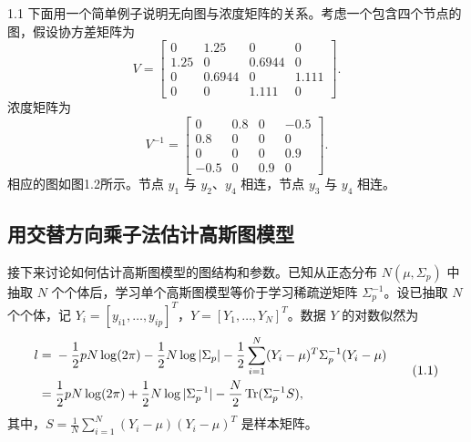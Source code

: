 \begin{bookexample}{1.1}
下面用一个简单例子说明无向图与浓度矩阵的关系。考虑一个包含四个节点的图，假设协方差矩阵为
\[
V=\begin{bmatrix}
0&1.25&0&0\\
1.25&0&0.6944&0\\
0&0.6944&0&1.111\\
0&0&1.111&0
\end{bmatrix}.
\]
浓度矩阵为
\[
V^{-1}=\begin{bmatrix}
0&0.8&0&-0.5\\
0.8&0&0&0\\
0&0&0&0.9\\
-0.5&0&0.9&0
\end{bmatrix}.
\]
相应的图如图1.2所示。节点 $y_1$ 与 $y_2$、$y_4$ 相连，节点 $y_3$ 与 $y_4$ 相连。
\end{bookexample}

\begin{figure}[htbp]
\centering
{}
\end{figure}

\subsection{用交替方向乘子法估计高斯图模型}

接下来讨论如何估计高斯图模型的图结构和参数。已知从正态分布 $N(\mu,\Sigma_p)$ 中抽取 $N$ 个个体后，学习单个高斯图模型等价于学习稀疏逆矩阵 $\Sigma_p^{-1}$。设已抽取 $N$ 个个体，记 $Y_i=[y_{i1},\ldots,y_{ip}]^T$，$Y=[Y_1,\ldots,Y_N]^T$。数据 $Y$ 的对数似然为
\begin{equation}
\begin{aligned}
l={}&-\frac12pN\log(2\pi)-\frac12N\log|\Sigma_p|
-\frac12\sum_{i=1}^N(Y_i-\mu)^T\Sigma_p^{-1}(Y_i-\mu)\\
={}&\frac12pN\log(2\pi)+\frac12N\log|\Sigma_p^{-1}|
-\frac N2\operatorname{Tr}(\Sigma_p^{-1}S),
\end{aligned}\tag{1.1}
\end{equation}
其中，$S=\frac1N\sum_{i=1}^N(Y_i-\mu)(Y_i-\mu)^T$ 是样本矩阵。

